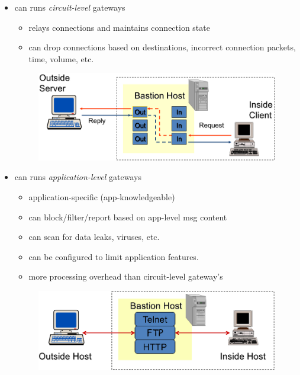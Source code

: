 \documentclass[twocolumn,landscape,10pt]{article}
\theoremstyle{definition}
\begin{document}
\begin{itemize}
    \item can runs \emph{circuit-level} gateways
        \begin{itemize}
            \item relays connections and maintains connection state
            \item can drop connections based on destinations, incorrect
                connection packets, time, volume, etc.
        \end{itemize} 
        \begin{figure}[h]
          	\includegraphics[scale=0.25]{clgw.png}
          	\centering
        \end{figure}
    \item can runs \emph{application-level} gateways
        \begin{itemize}
            \item application-specific (app-knowledgeable)
            \item can block/filter/report based on app-level msg content
            \item can scan for data leaks, viruses, etc.
            \item can be configured to limit application features.
            \item more processing overhead than circuit-level gateway's
        \end{itemize} 
        \begin{figure}[h]
          	\includegraphics[scale=0.25]{algw.png}
          	\centering
        \end{figure}

\end{itemize}
\end{document}
